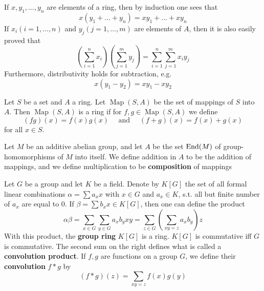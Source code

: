 \documentclass[11pt]{article}
\def \Map {\operatorname{Map}}
\begin{document}
If \(x,y_1,\dots,y_n\) are elements of a ring, then by induction one sees that
\begin{equation*}
x(y_1+\dots+y_n)=xy_1+\dots+xy_n
\end{equation*}
If \(x_i(i=1,\dots,n)\) and \(y_j(j=1,\dots,m)\) are elements of \(A\), then it is also easily proved that
\begin{equation*}
\left( \sum_{i=1}^nx_i \right)\left( \sum_{j=1}^my_j \right)=
\sum_{i=1}^n\sum_{j=1}^mx_iy_j
\end{equation*}
Furthermore, distributivity holds for subtraction, e.g.
\begin{equation*}
x(y_1-y_2)=xy_1-xy_2
\end{equation*}

\begin{examplle}[]
Let \(S\) be a set and \(A\) a ring. Let \(\Map(S,A)\) be the set of mappings of \(S\)
into \(A\). Then \(\Map(S,A)\) is a ring if for \(f,g\in\Map(S,A)\) we define
\begin{equation*}
(fg)(x)=f(x)g(x)\quad\text{ and }\quad (f+g)(x)=f(x)+g(x)
\end{equation*}
for all \(x\in S\).

Let \(M\) be an additive abelian group, and let \(A\) be the set \(\operatorname{End}(M)\) of
group-homomorphisms of \(M\) into itself. We define addition in \(A\) to be the addition of
mappings, and we define multiplication to be \textbf{composition} of mappings
\end{examplle}

\begin{examplle}
Let \(G\) be a group and let \(K\) be a field. Denote by \(K[G]\) the set of all formal linear
combinations \(\alpha=\sum a_xx\) with \(x\in G\) and \(a_x\in K\), s.t. all but finite number of \(a_x\) are
equal to 0. If \(\beta=\sum b_xx\in K[G]\), then one can define the product
\begin{equation*}
\alpha\beta=\sum_{x\in G}\sum_{y\in G}a_xb_yxy=\sum_{z\in G}\left( \sum_{xy=z}a_xb_y \right)z
\end{equation*}
With this product, the \textbf{group ring} \(K[G]\) is a ring. \(K[G]\) is commutative iff \(G\) is
commutative. The second sum on the right  defines what is called a \textbf{convolution product}.
If \(f,g\) are functions on a group \(G\), we define their \textbf{convolution} \(f*g\) by
\begin{equation*}
(f*g)(z)=\sum_{xy=z}f(x)g(y)
\end{equation*}
\end{examplle}
\end{document}
